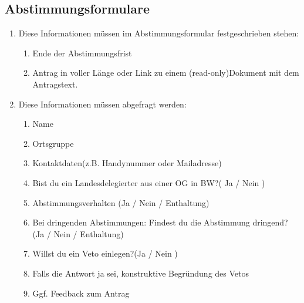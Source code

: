\documentclass[a4paper,
  ]{scrartcl}
\begin{document}
\subsection{Abstimmungsformulare}
\begin{enumerate}
      \item Diese Informationen müssen im Abstimmungsformular festgeschrieben stehen:
            \begin{enumerate}
                  \item Ende der Abstimmungsfrist
                  \item Antrag in voller Länge oder Link zu einem (read-only)Dokument mit dem Antragstext.
            \end{enumerate}
      \item Diese Informationen müssen abgefragt werden:
            \begin{enumerate}
                  \item Name
                  \item Ortsgruppe
                  \item Kontaktdaten(z.B. Handynummer oder Mailadresse)
                  \item \glqq{}Bist du ein Landesdelegierter aus einer OG in BW?\grqq( Ja / Nein )
                  \item Abstimmungsverhalten (Ja / Nein / Enthaltung)
                  \item Bei dringenden Abstimmungen: \glqq{}Findest du die Abstimmung dringend?\grqq
                        (Ja / Nein / Enthaltung)
                  \item \glqq{}Willst du ein Veto einlegen?\grqq (Ja / Nein )
                  \item Falls die Antwort ja sei, konstruktive Begründung des Vetos
                  \item Ggf. Feedback zum Antrag
            \end{enumerate}
\end{enumerate}
\end{document}
